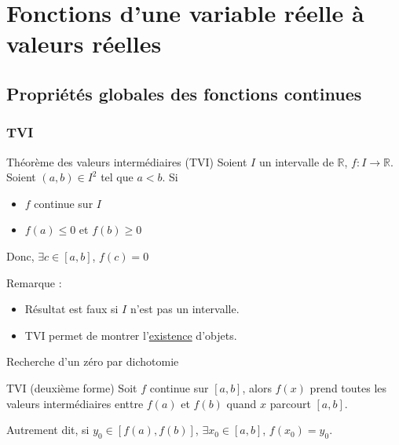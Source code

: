 \chapter{Fonctions d'une variable réelle à valeurs réelles} %
\label{chap:Fonctions d'une variable réelle à valeurs réelles}

\section{Propriétés globales des fonctions continues} %
\label{sec:Propriétés globales des fonctions continues}

\subsection{TVI} %
\label{sub:TVI}

\begin{Theorem}{Théorème des valeurs intermédiaires (TVI)}{}
Soient $I$ un intervalle de $\mathbb{R}$, $f: I \to \mathbb{R}$. Soient $(a,b) \in I ^{2}$ tel que $a <b$. Si 
\begin{itemize}

    \item $f$ continue sur $I$ 
    \item $f(a) \le 0$ et $f(b) \ge 0$ 

\end{itemize}
Donc, $\exists c \in [a,b]$, $f(c) =0$
\end{Theorem}

Remarque :
\begin{itemize}

    \item Résultat est faux si $I$ n'est pas un intervalle.
    \item TVI permet de montrer l'\underline{existence} d'objets.

\end{itemize}

\begin{Theorem}{Recherche d'un zéro par dichotomie}{}

\end{Theorem}


\begin{Theorem}{TVI (deuxième forme)}{}
  Soit $f$ continue sur $[a,b]$, alors $f(x)$ prend toutes les valeurs intermédiaires enttre $f(a)$ et $f(b)$ quand $x$ parcourt $[a,b]$. 

  Autrement dit, si $y_0 \in [f(a), f(b)]$, $\exists x_0 \in [a,b]$, $f(x_0)= y_0$.
\end{Theorem}

